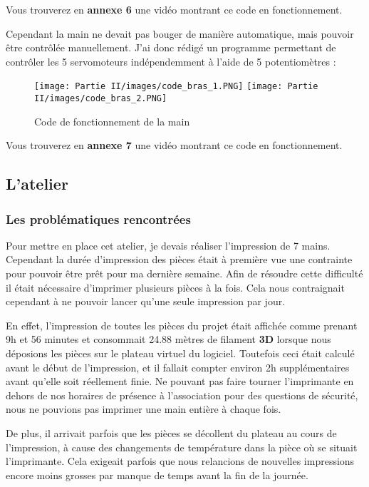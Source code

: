 Vous trouverez en \textbf{annexe 6} une vidéo montrant ce code en fonctionnement.

\newpage

Cependant la main ne devait pas bouger de manière automatique, mais pouvoir être contrôlée manuellement. J'ai donc rédigé un programme permettant de contrôler les 5 servomoteurs indépendemment à l'aide de 5 potentiomètres : 

\begin{figure}[!h]
    \centering
    \texttt{[image: Partie II/images/code\_bras\_1.PNG]}
    \texttt{[image: Partie II/images/code\_bras\_2.PNG]}
    \caption[\, \, Code de fonctionnement]{Code de fonctionnement de la main}
    \label{fig_4.2.2.2}
\end{figure}

Vous trouverez en \textbf{annexe 7} une vidéo montrant ce code en fonctionnement.

\newpage

\subsection{L'atelier}

\subsubsection{Les problématiques rencontrées}

Pour mettre en place cet atelier, je devais réaliser l'impression de 7 mains. Cependant la durée d'impression des pièces était à première vue une contrainte pour pouvoir être prêt pour ma dernière semaine. Afin de résoudre cette difficulté il était nécessaire d'imprimer plusieurs pièces à la fois. Cela nous contraignait cependant à ne pouvoir lancer qu'une seule impression par jour.

\vspace{0.5cm}
En effet, l'impression de toutes les pièces du projet était affichée comme prenant 9h et 56 minutes et consommait 24.88 mètres de filament \textbf{3D} lorsque nous déposions les pièces sur le plateau virtuel du logiciel. Toutefois ceci était calculé avant le début de l'impression, et il fallait compter environ 2h supplémentaires avant qu'elle soit réellement finie. Ne pouvant pas faire tourner l'imprimante en dehors de nos horaires de présence à l'association pour des questions de sécurité, nous ne pouvions pas imprimer une main entière à chaque fois.

\vspace{0.5cm}
De plus, il arrivait parfois que les pièces se décollent du plateau au cours de l'impression, à cause des changements de température dans la pièce où se situait l'imprimante. Cela exigeait parfois que nous relancions de nouvelles impressions encore moins grosses par manque de temps avant la fin de la journée.


